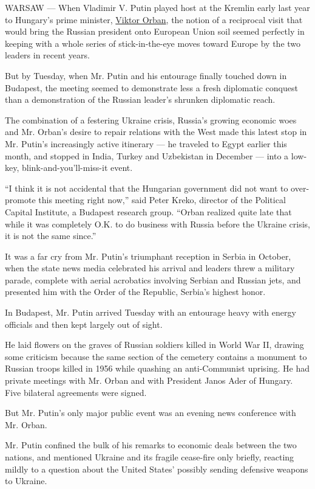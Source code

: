 WARSAW --- When Vladimir V. Putin played host at the Kremlin early last
year to Hungary's prime minister,
\href{http://topics.nytimes.com/top/reference/timestopics/people/o/viktor_orban/index.html?8qa}{Viktor
Orban}, the notion of a reciprocal visit that would bring the Russian
president onto European Union soil seemed perfectly in keeping with a
whole series of stick-in-the-eye moves toward Europe by the two leaders
in recent years.

But by Tuesday, when Mr. Putin and his entourage finally touched down in
Budapest, the meeting seemed to demonstrate less a fresh diplomatic
conquest than a demonstration of the Russian leader's shrunken
diplomatic reach.

The combination of a festering Ukraine crisis, Russia's growing economic
woes and Mr. Orban's desire to repair relations with the West made this
latest stop in Mr. Putin's increasingly active itinerary --- he traveled
to Egypt earlier this month, and stopped in India, Turkey and Uzbekistan
in December --- into a low-key, blink-and-you'll-miss-it event.

``I think it is not accidental that the Hungarian government did not
want to over-promote this meeting right now,'' said Peter Kreko,
director of the Political Capital Institute, a Budapest research group.
``Orban realized quite late that while it was completely O.K. to do
business with Russia before the Ukraine crisis, it is not the same
since.''

It was a far cry from Mr. Putin's triumphant reception in Serbia in
October, when the state news media celebrated his arrival and leaders
threw a military parade, complete with aerial acrobatics involving
Serbian and Russian jets, and presented him with the Order of the
Republic, Serbia's highest honor.

In Budapest, Mr. Putin arrived Tuesday with an entourage heavy with
energy officials and then kept largely out of sight.

He laid flowers on the graves of Russian soldiers killed in World War
II, drawing some criticism because the same section of the cemetery
contains a monument to Russian troops killed in 1956 while quashing an
anti-Communist uprising. He had private meetings with Mr. Orban and with
President Janos Ader of Hungary. Five bilateral agreements were signed.

But Mr. Putin's only major public event was an evening news conference
with Mr. Orban.

Mr. Putin confined the bulk of his remarks to economic deals between the
two nations, and mentioned Ukraine and its fragile cease-fire only
briefly, reacting mildly to a question about the United States' possibly
sending defensive weapons to Ukraine.

